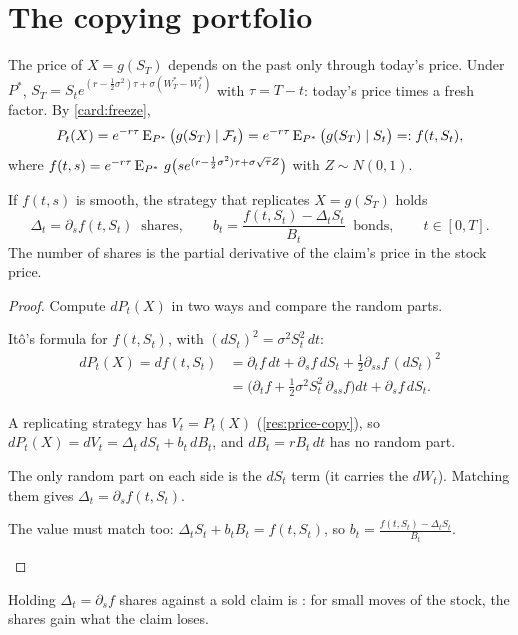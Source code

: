 \section{The copying portfolio}

The price of $X=g(S_T)$ depends on the past only through today's price. Under $P^*$, $S_T=S_te^{(r-\frac12\sigma^2)\tau+\sigma(W^*_T-W^*_t)}$ with $\tau=T-t$: today's price times a fresh factor. By \cref{card:freeze},
\[
  P_t(X)=e^{-r\tau}\operatorname{E}_{P^*}\big(g(S_T)\mid\mathcal F_t\big)=e^{-r\tau}\operatorname{E}_{P^*}\big(g(S_T)\mid S_t\big)=:f(t,S_t),
\]
where $f(t,s)=e^{-r\tau}\operatorname{E}_{P^*}\,g\big(se^{(r-\frac12\sigma^2)\tau+\sigma\sqrt\tau Z}\big)$ with $Z\sim N(0,1)$.

\begin{theorem}
\label{thm:delta-hedge}
If $f(t,s)$ is smooth, the strategy that replicates $X=g(S_T)$ holds
\[
  \Delta_t=\partial_sf(t,S_t)\ \text{ shares},\qquad b_t=\frac{f(t,S_t)-\Delta_tS_t}{B_t}\ \text{ bonds},\qquad t\in[0,T].
\]
The number of shares is the partial derivative of the claim's price in the stock price.
\end{theorem}
\begin{proof}
Compute $dP_t(X)$ in two ways and compare the random parts.
\begin{steps}
  \item Itô's formula for $f(t,S_t)$, with $(dS_t)^2=\sigma^2S_t^2\,dt$:
  \[
    \begin{aligned}
    dP_t(X)=df(t,S_t)&=\partial_tf\,dt+\partial_sf\,dS_t+\tfrac12\partial_{ss}f\,(dS_t)^2\\
    &=\big(\partial_tf+\tfrac12\sigma^2S_t^2\,\partial_{ss}f\big)dt+\partial_sf\,dS_t.
    \end{aligned}
  \]
  \item A replicating strategy has $V_t=P_t(X)$ (\cref{res:price-copy}), so $dP_t(X)=dV_t=\Delta_t\,dS_t+b_t\,dB_t$, and $dB_t=rB_t\,dt$ has no random part.
  \item The only random part on each side is the $dS_t$ term (it carries the $dW_t$). Matching them gives $\Delta_t=\partial_sf(t,S_t)$.
  \item The value must match too: $\Delta_tS_t+b_tB_t=f(t,S_t)$, so $b_t=\frac{f(t,S_t)-\Delta_tS_t}{B_t}$. \qedhere
\end{steps}
\end{proof}

Holding $\Delta_t=\partial_sf$ shares against a sold claim is : for small moves of the stock, the shares gain what the claim loses.

